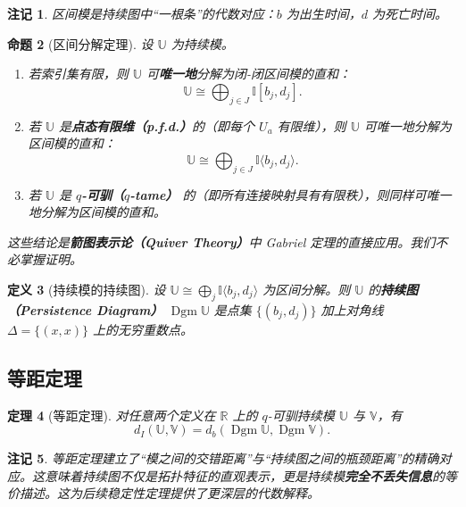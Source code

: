 \documentclass[UTF8]{ctexart}
\newtheorem{definition}{定义}[section]
\newtheorem{proposition}[definition]{命题}
\newtheorem{remark}[definition]{注记}
\newtheorem{theorem}[definition]{定理}
\begin{document}
\begin{remark}
区间模是持续图中“一根条”的代数对应：\(b\) 为出生时间，\(d\) 为死亡时间。
\end{remark}

\begin{proposition}[区间分解定理]
\label{prop:interval-decomposition}
设 \(\mathbb{U}\) 为持续模。
\begin{enumerate}
    \item 若索引集有限，则 \(\mathbb{U}\) 可\textbf{唯一地}分解为闭-闭区间模的直和：
    \[
    \mathbb{U} \cong \bigoplus_{j \in J} \mathbb{I}[b_j, d_j].
    \]
    \item 若 \(\mathbb{U}\) 是\textbf{点态有限维（p.f.d.）}的（即每个 \(U_a\) 有限维），则 \(\mathbb{U}\) 可唯一地分解为区间模的直和：
    \[
    \mathbb{U} \cong \bigoplus_{j \in J} \mathbb{I}\langle b_j, d_j \rangle.
    \]
    \item 若 \(\mathbb{U}\) 是 \textbf{\(q\)-可驯（\(q\)-tame）} 的（即所有连接映射具有有限秩），则同样可唯一地分解为区间模的直和。
\end{enumerate}
这些结论是\textbf{箭图表示论（Quiver Theory）}中 Gabriel 定理的直接应用。我们不必掌握证明。
\end{proposition}


\begin{definition}[持续模的持续图]
\label{def:pm-persistence-diagram}
设 \(\mathbb{U} \cong \bigoplus_{j} \mathbb{I}\langle b_j, d_j \rangle\) 为区间分解。则 \(\mathbb{U}\) 的\textbf{持续图（Persistence Diagram）} \(\operatorname{Dgm}\mathbb{U}\) 是点集 \(\{(b_j, d_j)\}\) 加上对角线 \(\Delta = \{(x,x)\}\) 上的无穷重数点。
\end{definition}

\subsection{等距定理}
\label{subsec:isometry}

\begin{theorem}[等距定理]
\label{thm:isometry}
对任意两个定义在 \(\mathbb{R}\) 上的 \(q\)-可驯持续模 \(\mathbb{U}\) 与 \(\mathbb{V}\)，有
\[
d_I(\mathbb{U}, \mathbb{V}) = d_b(\operatorname{Dgm}\mathbb{U}, \operatorname{Dgm}\mathbb{V}).
\]
\end{theorem}

\begin{remark}
等距定理建立了“模之间的交错距离”与“持续图之间的瓶颈距离”的精确对应。这意味着持续图不仅是拓扑特征的直观表示，更是持续模\textbf{完全不丢失信息}的等价描述。这为后续稳定性定理提供了更深层的代数解释。
\end{remark}
\end{document}
